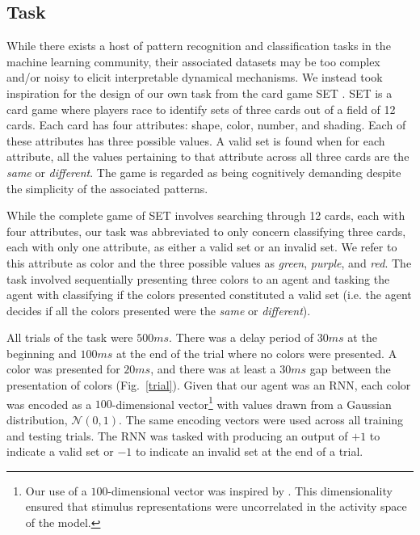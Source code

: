 \documentclass[conference]{IEEEtran}
\begin{document}
\subsection{Task}
\label{taskmethod}

While there exists a host of pattern recognition and classification tasks in the machine learning community\cite{bishop2006pattern,lecun2015deep}, their associated datasets may be too complex and/or noisy to elicit interpretable dynamical mechanisms. We instead took inspiration for the design of our own task from the card game SET \cite{gordon2017joy}. SET is a card game where players race to identify sets of three cards out of a field of 12 cards. Each card has four attributes: shape, color, number, and shading. Each of these attributes has three possible values. A valid set is found when for each attribute, all the values pertaining to that attribute across all three cards are the \textit{same} or \textit{different}. The game is regarded as being cognitively demanding despite the simplicity of the associated patterns\cite{gordon2017joy}.

While the complete game of SET involves searching through 12 cards, each with four attributes, our task was abbreviated to only concern classifying three cards, each with only one attribute, as either a valid set or an invalid set. We refer to this attribute as color and the three possible values as \textit{green}, \textit{purple}, and \textit{red}. The task involved sequentially presenting three colors to an agent and tasking the agent with classifying if the colors presented constituted a valid set (i.e. the agent decides if all the colors presented were the \textit{same} or \textit{different}).

All trials of the task were $500 ms$. There was a delay period of $30 ms$ at the beginning and $100 ms$ at the end of the trial where no colors were presented. A color was presented for $20 ms$, and there was at least a $30 ms$ gap between the presentation of colors (Fig.~\ref{trial}). Given that our agent was an RNN, each color was encoded as a $100$-dimensional vector\footnote{Our use of a $100$-dimensional vector was inspired by \cite{kay2022neural}. This dimensionality ensured that stimulus representations were uncorrelated in the activity space of the model.} with values drawn from a Gaussian distribution, $\mathcal{N}(0,1)$. The same encoding vectors were used across all training and testing trials. The RNN was tasked with producing an output of $+1$ to indicate a valid set or $-1$ to indicate an invalid set at the end of a trial.
\end{document}
